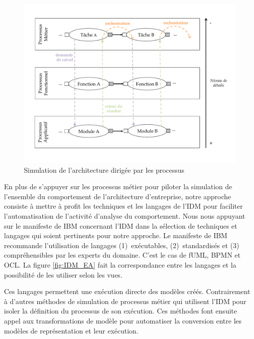 \begin{figure}[!ht]
 \begin{center}
  \includegraphics[trim= 0cm 3cm 0cm 0cm, 
width=1\textwidth]{figures/4_demarche/approche_simulation.pdf}
 \end{center}
 \caption{Simulation de l'architecture dirigée par les processus}
 \label{fig:Simulation_Approche}
\end{figure}

En plus de s'appuyer sur les processus métier pour piloter la simulation de 
l'ensemble du comportement de l'architecture d'entreprise, notre approche 
consiste à mettre à profit les techniques et les langages de l'IDM pour 
faciliter l'automatisation de l'activité d'analyse du comportement. Nous nous 
appuyant sur le manifeste de IBM \cite{chesbrough2006research} concernant l'IDM 
dans la sélection de techniques et langages qui soient pertinents pour notre 
approche. Le manifeste de IBM recommande l'utilisation de langages 
(1)~exécutables, (2)~standardisés et (3) compréhensibles par les experts du 
domaine. C'est le cas de fUML, BPMN et OCL. La figure \ref{fig:IDM_EA} fait la 
correspondance entre les langages et la possibilité de les utiliser selon les 
vues. 


Ces langages permettent une exécution directe des modèles créés. Contrairement à 
d'autres méthodes de simulation de processus métier qui utilisent l'IDM pour 
isoler la définition du processus de son exécution. Ces méthodes font ensuite 
appel aux transformations de modèle pour automatiser la conversion entre les 
modèles de représentation et leur exécution. 

